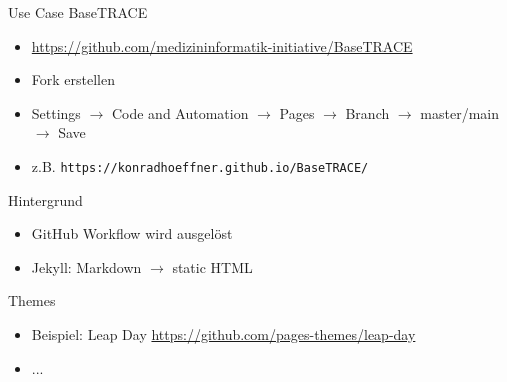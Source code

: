 \documentclass[14pt,aspectratio=1610]{beamer}
\begin{document}
\begin{frame}{Use Case BaseTRACE}
\begin{itemize}
\item \url{https://github.com/medizininformatik-initiative/BaseTRACE}
\item Fork erstellen
\item Settings $\rightarrow$ Code and Automation $\rightarrow$ Pages $\rightarrow$ Branch $\rightarrow$ master/main $\rightarrow$ Save
\item z.B. \texttt{https://konradhoeffner.github.io/BaseTRACE/}
\end{itemize}
\end{frame}

\begin{frame}{Hintergrund}
\begin{itemize}
\item GitHub Workflow wird ausgelöst
\item Jekyll: Markdown $\rightarrow$ static HTML
\end{itemize}
\end{frame}

\begin{frame}{Themes}
\begin{itemize}
\item Beispiel: Leap Day \url{https://github.com/pages-themes/leap-day}
\item ...
\end{itemize}
\end{frame}

\iffalse
\begin{frame}{Varianten}
\begin{itemize}
\item GitHub Flavored Markdown (GFM) $\supset$ CommonMark
\item Jekyll: Kramdown 
\end{itemize}
\end{frame}

\begin{frame}{Use Case BaseTRACE}
\begin{itemize}
\item \url{https://github.com/medizininformatik-initiative/BaseTRACE}
\item Fork erstellen
\item Settings $\rightarrow$ Code and Automation $\rightarrow$ Pages $\rightarrow$ Branch $\rightarrow$ master/main $\rightarrow$ Save
\item z.B. \texttt{https://konradhoeffner.github.io/BaseTRACE/}
\end{itemize}
\end{frame}

\begin{frame}{Links}
\begin{itemize}
\item \url{https://www.w3.org/TR/shacl/}
\item \url{https://www.ldf.fi/service/owl-rl-reasoner}
\item \url{https://github.com/konradhoeffner/shacl}
\end{itemize}
\end{frame}
\fi
\end{document}
